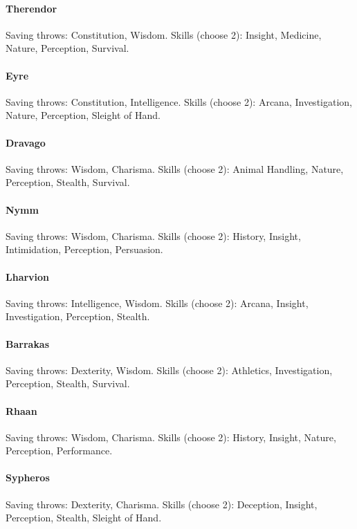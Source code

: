 \documentclass[twocolumn]{dndbook}
\begin{document}
\paragraph*{Therendor} Saving throws: Constitution, Wisdom. Skills (choose 2): Insight, Medicine, Nature, Perception, Survival.

\paragraph*{Eyre} Saving throws: Constitution, Intelligence. Skills (choose 2): Arcana, Investigation, Nature, Perception, Sleight of Hand.

\paragraph*{Dravago} Saving throws: Wisdom, Charisma. Skills (choose 2): Animal Handling, Nature, Perception, Stealth, Survival.

\paragraph*{Nymm} Saving throws: Wisdom, Charisma. Skills (choose 2): History, Insight, Intimidation, Perception, Persuasion.

\paragraph*{Lharvion} Saving throws: Intelligence, Wisdom. Skills (choose 2): Arcana, Insight, Investigation, Perception, Stealth.

\paragraph*{Barrakas} Saving throws: Dexterity, Wisdom. Skills (choose 2): Athletics, Investigation, Perception, Stealth, Survival.

\paragraph*{Rhaan} Saving throws: Wisdom, Charisma. Skills (choose 2): History, Insight, Nature, Perception, Performance.

\paragraph*{Sypheros} Saving throws: Dexterity, Charisma. Skills (choose 2): Deception, Insight, Perception, Stealth, Sleight of Hand.
\end{document}
